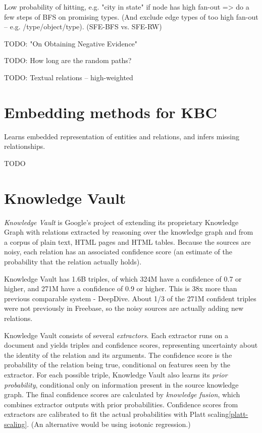 Low probability of hitting, e.g. "city in state" if node has high fan-out =>
do a few steps of BFS on promising types. (And exclude edge types of too high
fan-out -- e.g. /type/object/type). (SFE-BFS vs. SFE-RW)

TODO: "On Obtaining Negative Evidence"

TODO: How long are the random paths?

TODO: Textual relations -- high-weighted

\section{Embedding methods for KBC}

Learns embedded representation of entities and relations, and infers missing
relationships.

TODO

\section{Knowledge Vault}

\textit{Knowledge Vault}\cite{knowledge-vault} is Google's project of extending
its proprietary Knowledge Graph with relations extracted by reasoning over
the knowledge graph and from a corpus of plain text, HTML pages and HTML
tables. Because the sources are noisy, each relation has an associated
confidence score (an estimate of the probability that the relation actually
holds).

Knowledge Vault has 1.6B triples, of which 324M have a confidence of 0.7 or
higher, and 271M have a confidence of 0.9 or higher.
This is 38x more than previous comparable system - DeepDive.
About 1/3 of the 271M confident triples were not previously in Freebase, so
the noisy sources are actually adding new relations.

Knowledge Vault consists of several \textit{extractors}. Each extractor runs on a
document and yields triples and confidence scores, representing uncertainty
about the identity of the relation and its arguments. The confidence score is
the probability of the relation being true, conditional on features seen by
the extractor.
For each possible triple, Knowledge Vault also learns its \textit{prior
probability}, conditional only on information present in the source knowledge
graph.
The final confidence scores are calculated by \textit{knowledge fusion},
which combines extractor outputs with prior probabilities.
Confidence scores from extractors are calibrated to fit the actual probabilities
with Platt scaling\ref{platt-scaling}.
(An alternative would be using isotonic regression.)

